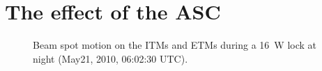 \section{The effect of the ASC}


\begin{figure}
\begin{centering}
\caption{Beam spot motion on the ITMs and ETMs during a 16~W lock at
  night (May21, 2010, 06:02:30 UTC).}
\label{fig:bsm}
\end{centering}
\end{figure}


